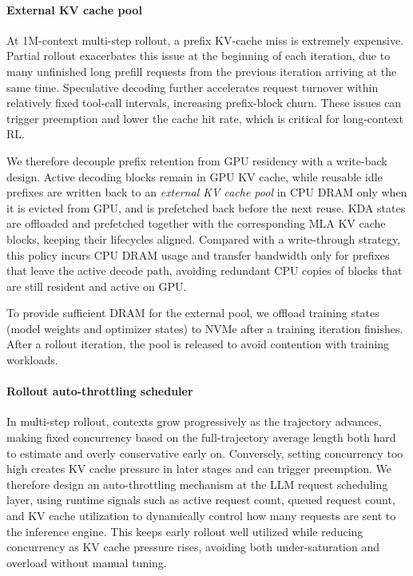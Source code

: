 \paragraph{External KV cache pool}
At 1M-context multi-step rollout, a prefix KV-cache miss is extremely expensive. Partial rollout exacerbates this issue at the beginning of each iteration, due to many unfinished long prefill requests from the previous iteration arriving at the same time. Speculative decoding further accelerates request turnover within relatively fixed tool-call intervals, increasing prefix-block churn. These issues can trigger preemption and lower the cache hit rate, which is critical for long-context RL.

We therefore decouple prefix retention from GPU residency with a write-back design.
Active decoding blocks remain in GPU KV cache, while reusable idle prefixes are written back to an \textit{external KV cache pool} in CPU DRAM only when it is evicted from GPU, and is prefetched back before the next reuse.
KDA states are offloaded and prefetched together with the corresponding MLA KV cache blocks, keeping their lifecycles aligned.
Compared with a write-through strategy, this policy incurs CPU DRAM usage and transfer bandwidth only for prefixes that leave the active decode path, avoiding redundant CPU copies of blocks that are still resident and active on GPU.

To provide sufficient DRAM for the external pool, we offload training states (model weights and optimizer states) to NVMe after a training iteration finishes. After a rollout iteration, the pool is released to avoid contention with training workloads.

\paragraph{Rollout auto-throttling scheduler}
In multi-step rollout, contexts grow progressively as the trajectory advances, making fixed concurrency based on the full-trajectory average length both hard to estimate and overly conservative early on.
Conversely, setting concurrency too high creates KV cache pressure in later stages and can trigger preemption.
We therefore design an auto-throttling mechanism at the LLM request scheduling layer, using runtime signals such as active request count, queued request count, and KV cache utilization to dynamically control how many requests are sent to the inference engine.
This keeps early rollout well utilized while reducing concurrency as KV cache pressure rises, avoiding both under-saturation and overload without manual tuning.

